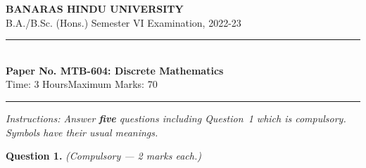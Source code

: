\documentclass[11pt,a4paper]{article}
\begin{document}
\begin{center}
  {\large\bfseries BANARAS HINDU UNIVERSITY}\\[2pt]
  {\normalsize B.A./B.Sc. (Hons.) Semester VI Examination, 2022-23}\\[6pt]
  \rule{0.8\linewidth}{0.5pt}\\[6pt]
  {\large\bfseries Paper No. MTB-604: Discrete Mathematics}\\[4pt]
  {\normalsize Time: 3 Hours\hfill Maximum Marks: 70}
\end{center}

\rule{\linewidth}{0.4pt}

\smallskip



\noindent   \textit{Instructions: Answer   \textbf{five} questions including Question~1 which is compulsory. Symbols have their usual meanings.}

\bigskip




\noindent   \textbf{Question 1.}   \textit{(Compulsory --- 2 marks each.)}
\end{document}
